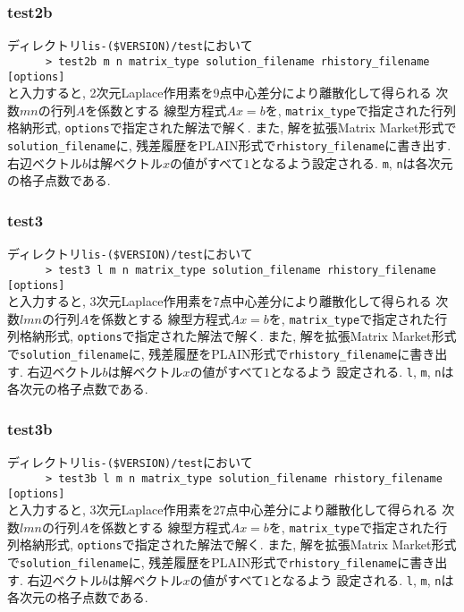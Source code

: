 \documentclass[a4paper]{jarticle}
\begin{document}
{{\subsubsection{test2b}
ディレクトリ{\tt lis-(\$VERSION)/test}において\\
 \verb+      > test2b m n matrix_type solution_filename rhistory_filename [options]+\\
と入力すると, 2次元Laplace作用素を9点中心差分により離散化して得られる
次数$mn$の行列$A$を係数とする
線型方程式$Ax=b$を, \verb|matrix_type|で指定された行列格納形式, 
{\tt options}で指定された解法で解く. また, 
解を拡張Matrix Market形式で{\tt solution\_filename}に, 
残差履歴をPLAIN形式で{\tt rhistory\_filename}に書き出す.
右辺ベクトル$b$は解ベクトル$x$の値がすべて$1$となるよう設定される. {\tt m}, {\tt n}は各次元の格子点数である. 

\subsubsection{test3}
ディレクトリ{\tt lis-(\$VERSION)/test}において\\
 \verb+      > test3 l m n matrix_type solution_filename rhistory_filename [options]+\\
と入力すると, 3次元Laplace作用素を7点中心差分により離散化して得られる
次数$lmn$の行列$A$を係数とする
線型方程式$Ax=b$を, \verb|matrix_type|で指定された行列格納形式, 
{\tt options}で指定された解法で解く. また, 
解を拡張Matrix Market形式で{\tt solution\_filename}に, 
残差履歴をPLAIN形式で{\tt rhistory\_filename}に書き出す.
右辺ベクトル$b$は解ベクトル$x$の値がすべて$1$となるよう
設定される. {\tt l}, {\tt m}, {\tt n}は各次元の格子点数である. 

\subsubsection{test3b}
ディレクトリ{\tt lis-(\$VERSION)/test}において\\
 \verb+      > test3b l m n matrix_type solution_filename rhistory_filename [options]+\\
と入力すると, 3次元Laplace作用素を27点中心差分により離散化して得られる
次数$lmn$の行列$A$を係数とする
線型方程式$Ax=b$を, \verb|matrix_type|で指定された行列格納形式, 
{\tt options}で指定された解法で解く. また, 
解を拡張Matrix Market形式で{\tt solution\_filename}に, 
残差履歴をPLAIN形式で{\tt rhistory\_filename}に書き出す.
右辺ベクトル$b$は解ベクトル$x$の値がすべて$1$となるよう
設定される. {\tt l}, {\tt m}, {\tt n}は各次元の格子点数である. 

}}
\end{document}
